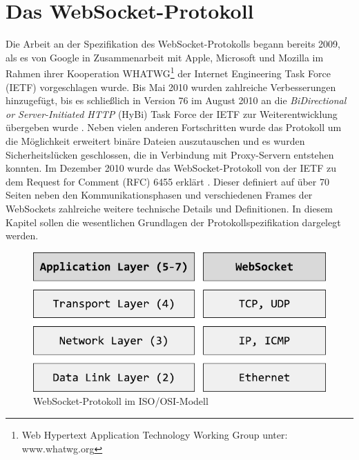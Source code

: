 \documentclass[11pt,a4paper,titlepage]{scrartcl}
\numberwithin{equation}{section}
\begin{document}
\section{Das WebSocket-Protokoll}\label{sec:WebSocketProtokoll}
Die Arbeit an der Spezifikation des WebSocket-Protokolls begann bereits 2009, als es von Google in Zusammenarbeit mit Apple, Microsoft und Mozilla im Rahmen ihrer Kooperation WHATWG\footnote{Web Hypertext Application Technology Working Group unter: www.whatwg.org} der Internet Engineering Task Force (IETF) vorgeschlagen wurde. Bis Mai 2010 wurden zahlreiche Verbesserungen hinzugefügt, bis es schließlich in Version 76 \autocite{hickson_websocket_2010} im August 2010 an die \textit{BiDirectional or Server-Initiated HTTP} (HyBi) Task Force der IETF zur Weiterentwicklung übergeben wurde \autocite{fette_websocket_2010}. Neben vielen anderen Fortschritten wurde das Protokoll um die Möglichkeit erweitert binäre Dateien auszutauschen und es wurden Sicherheitslücken geschlossen, die in Verbindung mit Proxy-Servern entstehen konnten. Im Dezember 2010 wurde das WebSocket-Protokoll von der IETF zu dem Request for Comment (RFC) 6455 erklärt \autocite{fette_websocket_2011}. Dieser definiert auf über 70 Seiten neben den Kommunikationsphasen und verschiedenen Frames der WebSockets zahlreiche weitere technische Details und Definitionen. In diesem Kapitel sollen die wesentlichen Grundlagen der Protokollspezifikation dargelegt werden.\\
\begin{figure}[ht] \label{fig:wsOSI}
\begin{center}
	\includegraphics[scale=1]{img/osi.pdf}
	\caption{WebSocket-Protokoll im ISO/OSI-Modell}
\end{center}
\end{figure}
\end{document}
